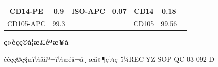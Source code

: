 \documentclass[UTF8,10pt,a4paper,fontset=fandol]{ctexart}
\newcommand{\fieldvalue}[1]{#1}
\newcommand{\handwritten}[1]{#1}
\begin{document}
\begin{tabularx}{\textwidth}{|c|c|c|c|c|c|c|}
\hline
CD14-PE &
\fieldvalue{\handwritten{0.9}} &
\multirow{2}{*}{ISO-APC} &
\fieldvalue{\handwritten{0.07}} &
CD14 &
\fieldvalue{\handwritten{0.18}} \\
\hline
CD105-APC &
\fieldvalue{\handwritten{99.3}} & & & CD105 &
\fieldvalue{\handwritten{99.56}} \\
\hline
\end{tabularx}


\newpage

\begin{center}
\textbf{ç»èçç©å­¦æ£éªæ¥å}
\end{center}

\noindent
ééçç©ç§æï¼åäº¬ï¼æéå¬å¸ \hfill æä»¶ç¼ç ï¼REC-YZ-SOP-QC-03-092-D
\end{document}
